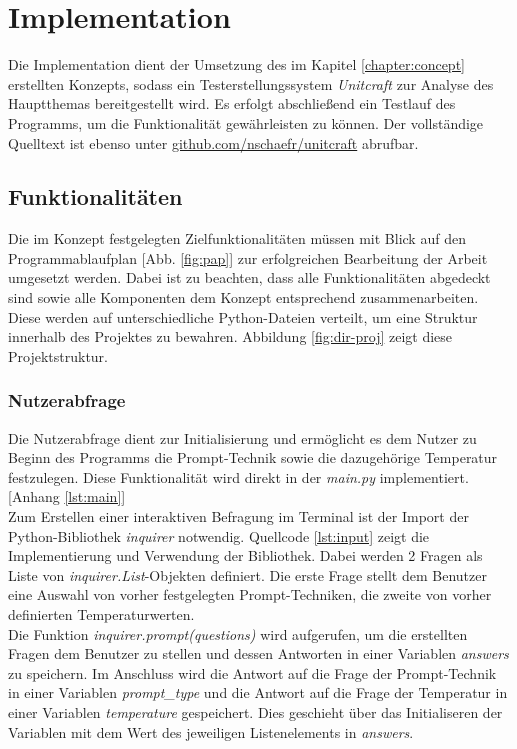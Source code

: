 \chapter{Implementation}\label{chapter:impl}
Die Implementation dient der Umsetzung des im Kapitel \ref{chapter:concept} erstellten Konzepts, sodass ein Testerstellungssystem \textit{Unitcraft} zur Analyse des Hauptthemas bereitgestellt wird. Es erfolgt abschließend ein Testlauf des Programms, um die Funktionalität gewährleisten zu können. Der vollständige Quelltext ist ebenso unter \href{https://github.com/nschaefr/unitcraft}{github.com/nschaefr/unitcraft} abrufbar.

\section{Funktionalitäten}
Die im Konzept festgelegten Zielfunktionalitäten müssen mit Blick auf den Programmablaufplan [Abb. \ref{fig:pap}] zur erfolgreichen Bearbeitung der Arbeit umgesetzt werden. Dabei ist zu beachten, dass alle Funktionalitäten abgedeckt sind sowie alle Komponenten dem Konzept entsprechend zusammenarbeiten. Diese werden auf unterschiedliche Python-Dateien verteilt, um eine Struktur innerhalb des Projektes zu bewahren. Abbildung \ref{fig:dir-proj} zeigt diese Projektstruktur.

\subsection{Nutzerabfrage}
Die Nutzerabfrage dient zur Initialisierung und ermöglicht es dem Nutzer zu Beginn des Programms die Prompt-Technik sowie die dazugehörige Temperatur festzulegen. Diese Funktionalität wird direkt in der \textit{main.py} implementiert. [Anhang \ref{lst:main}] \\Zum Erstellen einer interaktiven Befragung im Terminal ist der Import der Python-Bibliothek \textit{inquirer} notwendig. Quellcode \ref{lst:input} zeigt die Implementierung und Verwendung der Bibliothek. Dabei werden 2 Fragen als Liste von \textit{inquirer.List}-Objekten definiert. Die erste Frage stellt dem Benutzer eine Auswahl von vorher festgelegten Prompt-Techniken, die zweite von vorher definierten Temperaturwerten.\\
\vspace{-.3cm}
Die Funktion \textit{inquirer.prompt(questions)} wird aufgerufen, um die erstellten Fragen dem Benutzer zu stellen und dessen Antworten in einer Variablen \textit{answers} zu speichern. Im Anschluss wird die Antwort auf die Frage der Prompt-Technik in einer Variablen \textit{prompt\_type} und die Antwort auf die Frage der Temperatur in einer Variablen \textit{temperature} gespeichert. Dies geschieht über das Initialiseren der Variablen mit dem Wert des jeweiligen Listenelements in \textit{answers}.

